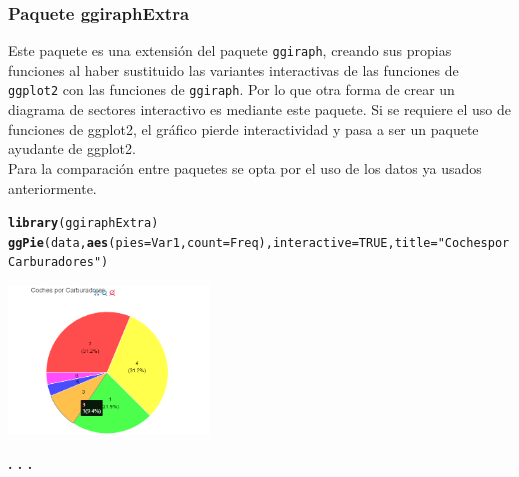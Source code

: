 \documentclass{article}\usepackage[]{graphicx}\usepackage[]{color}
\makeatletter
\newcommand{\hlnum}[1]{\textcolor[rgb]{0.686,0.059,0.569}{#1}}%
\newcommand{\hlstr}[1]{\textcolor[rgb]{0.192,0.494,0.8}{#1}}%
\newcommand{\hlstd}[1]{\textcolor[rgb]{0.345,0.345,0.345}{#1}}%
\newcommand{\hlkwc}[1]{\textcolor[rgb]{0.333,0.667,0.333}{#1}}%
\newcommand{\hlkwd}[1]{\textcolor[rgb]{0.737,0.353,0.396}{\textbf{#1}}}%
\newenvironment{kframe}{%
 \def\at@end@of@kframe{}%
 \ifinner\ifhmode%
  \def\at@end@of@kframe{\end{minipage}}%
  \begin{minipage}{\columnwidth}%
 \fi\fi%
 \def\FrameCommand##1{\hskip\@totalleftmargin \hskip-\fboxsep
 \colorbox{shadecolor}{##1}\hskip-\fboxsep
     \hskip-\linewidth \hskip-\@totalleftmargin \hskip\columnwidth}%
 \MakeFramed {\advance\hsize-\width
   \@totalleftmargin\z@ \linewidth\hsize
   \@setminipage}}%
 {\par\unskip\endMakeFramed%
 \at@end@of@kframe}
\newenvironment{knitrout}{}{} %
\makeatother
\begin{document}
\subsubsection{Paquete ggiraphExtra}
Este paquete %
es una extensi\'on del paquete \texttt{ggiraph}, creando sus propias funciones al haber sustituido las variantes interactivas de las funciones de \texttt{ggplot2} con las funciones de \texttt{ggiraph}. Por lo que otra forma de crear un diagrama de sectores interactivo es mediante este paquete. Si se requiere el uso de funciones de ggplot2, el gr\'afico pierde interactividad y pasa a ser un paquete ayudante de ggplot2.~\\
Para la comparaci\'on entre paquetes se opta por el uso de los datos ya usados anteriormente. 
\begin{knitrout}
\color{fgcolor}\begin{kframe}
\begin{alltt}
\hlkwd{library}\hlstd{(ggiraphExtra)}
\hlkwd{ggPie}\hlstd{(data,} \hlkwd{aes}\hlstd{(} \hlkwc{pies}\hlstd{=Var1,} \hlkwc{count}\hlstd{=Freq),} \hlkwc{interactive} \hlstd{=} \hlnum{TRUE}\hlstd{,} \hlkwc{title} \hlstd{=} \hlstr{"Coches por Carburadores"}\hlstd{)}
\end{alltt}
\end{kframe}
\end{knitrout}
\vbox{
    \centering
    \includegraphics[width=0.4\textwidth]{imag/pir_ggiraph}
}
\begin{center}
\textbf{. . .}
\end{center}
\end{document}
